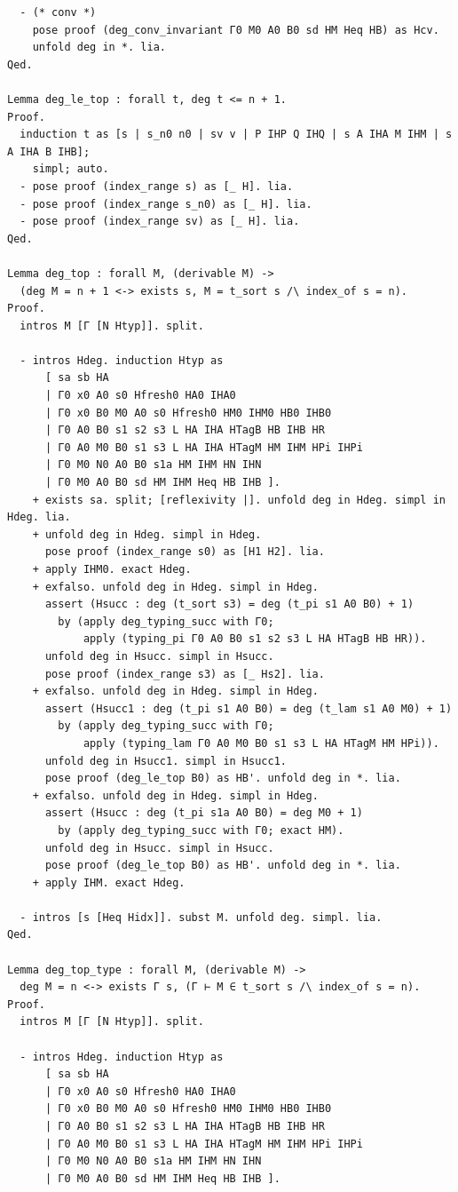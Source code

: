 \begin{latin}
\begin{verbatim}
  - (* conv *)
    pose proof (deg_conv_invariant Γ0 M0 A0 B0 sd HM Heq HB) as Hcv.
    unfold deg in *. lia.
Qed.

Lemma deg_le_top : forall t, deg t <= n + 1.
Proof.
  induction t as [s | s_n0 n0 | sv v | P IHP Q IHQ | s A IHA M IHM | s A IHA B IHB];
    simpl; auto.
  - pose proof (index_range s) as [_ H]. lia.
  - pose proof (index_range s_n0) as [_ H]. lia.
  - pose proof (index_range sv) as [_ H]. lia.
Qed.

Lemma deg_top : forall M, (derivable M) ->
  (deg M = n + 1 <-> exists s, M = t_sort s /\ index_of s = n).
Proof.
  intros M [Γ [N Htyp]]. split.

  - intros Hdeg. induction Htyp as
      [ sa sb HA
      | Γ0 x0 A0 s0 Hfresh0 HA0 IHA0
      | Γ0 x0 B0 M0 A0 s0 Hfresh0 HM0 IHM0 HB0 IHB0
      | Γ0 A0 B0 s1 s2 s3 L HA IHA HTagB HB IHB HR
      | Γ0 A0 M0 B0 s1 s3 L HA IHA HTagM HM IHM HPi IHPi
      | Γ0 M0 N0 A0 B0 s1a HM IHM HN IHN
      | Γ0 M0 A0 B0 sd HM IHM Heq HB IHB ].
    + exists sa. split; [reflexivity |]. unfold deg in Hdeg. simpl in Hdeg. lia.
    + unfold deg in Hdeg. simpl in Hdeg.
      pose proof (index_range s0) as [H1 H2]. lia.
    + apply IHM0. exact Hdeg.
    + exfalso. unfold deg in Hdeg. simpl in Hdeg.
      assert (Hsucc : deg (t_sort s3) = deg (t_pi s1 A0 B0) + 1)
        by (apply deg_typing_succ with Γ0;
            apply (typing_pi Γ0 A0 B0 s1 s2 s3 L HA HTagB HB HR)).
      unfold deg in Hsucc. simpl in Hsucc.
      pose proof (index_range s3) as [_ Hs2]. lia.
    + exfalso. unfold deg in Hdeg. simpl in Hdeg.
      assert (Hsucc1 : deg (t_pi s1 A0 B0) = deg (t_lam s1 A0 M0) + 1)
        by (apply deg_typing_succ with Γ0;
            apply (typing_lam Γ0 A0 M0 B0 s1 s3 L HA HTagM HM HPi)).
      unfold deg in Hsucc1. simpl in Hsucc1.
      pose proof (deg_le_top B0) as HB'. unfold deg in *. lia.
    + exfalso. unfold deg in Hdeg. simpl in Hdeg.
      assert (Hsucc : deg (t_pi s1a A0 B0) = deg M0 + 1)
        by (apply deg_typing_succ with Γ0; exact HM).
      unfold deg in Hsucc. simpl in Hsucc.
      pose proof (deg_le_top B0) as HB'. unfold deg in *. lia.
    + apply IHM. exact Hdeg.

  - intros [s [Heq Hidx]]. subst M. unfold deg. simpl. lia.
Qed.

Lemma deg_top_type : forall M, (derivable M) ->
  deg M = n <-> exists Γ s, (Γ ⊢ M ∈ t_sort s /\ index_of s = n).
Proof.
  intros M [Γ [N Htyp]]. split.

  - intros Hdeg. induction Htyp as
      [ sa sb HA
      | Γ0 x0 A0 s0 Hfresh0 HA0 IHA0
      | Γ0 x0 B0 M0 A0 s0 Hfresh0 HM0 IHM0 HB0 IHB0
      | Γ0 A0 B0 s1 s2 s3 L HA IHA HTagB HB IHB HR
      | Γ0 A0 M0 B0 s1 s3 L HA IHA HTagM HM IHM HPi IHPi
      | Γ0 M0 N0 A0 B0 s1a HM IHM HN IHN
      | Γ0 M0 A0 B0 sd HM IHM Heq HB IHB ].


\end{verbatim}
\end{latin}
